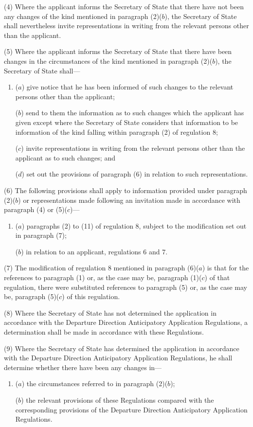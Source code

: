 \documentclass[a4paper]{article}
\begin{document}
(4) Where the applicant informs the Secretary of State that there have not been
any changes of the kind mentioned in paragraph (2)($b$), the Secretary of State
shall nevertheless invite representations in writing from the relevant persons
other than the applicant.

(5) Where the applicant informs the Secretary of State that there have been
changes in the circumstances of the kind mentioned in paragraph (2)($b$), the
Secretary of State shall—
\begin{enumerate}\item[]
($a$) give notice that he has been informed of such changes to the relevant persons
other than the applicant;

($b$) send to them the information as to such changes which the applicant has given
except where the Secretary of State considers that information to be information
of the kind falling within paragraph (2) of regulation 8;

($c$) invite representations in writing from the relevant persons other than the
applicant as to such changes; and

($d$) set out the provisions of paragraph (6) in relation to such representations.
\end{enumerate}

(6) The following provisions shall apply to information provided under paragraph
(2)($b$) or representations made following an invitation made in accordance with
paragraph (4) or (5)($c$)—
\begin{enumerate}\item[]
($a$) paragraphs (2) to (11) of regulation 8, subject to the modification set out
in paragraph (7);

($b$) in relation to an applicant, regulations 6 and 7.
\end{enumerate}

(7) The modification of regulation 8 mentioned in paragraph (6)($a$) is that for
the references to paragraph (1) or, as the case may be, paragraph (1)($c$) of that
regulation, there were substituted references to paragraph (5) or, as the case
may be, paragraph (5)($c$) of this regulation.

(8) Where the Secretary of State has not determined the application in
accordance with the Departure Direction Anticipatory Application Regulations, a
determination shall be made in accordance with these Regulations.

(9) Where the Secretary of State has determined the application in accordance
with the Departure Direction Anticipatory Application Regulations, he shall
determine whether there have been any changes in—
\begin{enumerate}\item[]
($a$) the circumstances referred to in paragraph (2)($b$);

($b$) the relevant provisions of these Regulations compared with the corresponding
provisions of the Departure Direction Anticipatory Application Regulations.
\end{enumerate}
\end{document}
